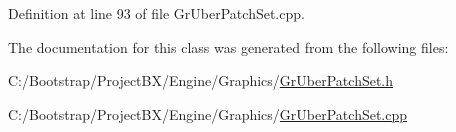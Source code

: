 Definition at line 93 of file GrUberPatchSet.cpp.

The documentation for this class was generated from the following files:\begin{CompactItemize}
\item 
C:/Bootstrap/ProjectBX/Engine/Graphics/\hyperlink{_gr_uber_patch_set_8h}{GrUberPatchSet.h}\item 
C:/Bootstrap/ProjectBX/Engine/Graphics/\hyperlink{_gr_uber_patch_set_8cpp}{GrUberPatchSet.cpp}\end{CompactItemize}

